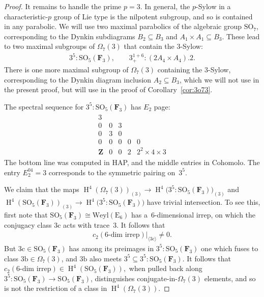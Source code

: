 \documentclass[pdftex]{sigma}
\numberwithin{equation}{section}
\newcommand\bF{\mathbf F}
\newcommand\bZ{\mathbf Z}
\newcommand\rb{\mathrm b}
\newcommand\rc{\mathrm c}
\newcommand\rE{\mathrm E}
\DeclareMathOperator\homology{H}
\renewcommand\H{\homology}
\newcommand\<\langle
\renewcommand\>\rangle
\newcommand\SO{\mathrm{SO}}
\begin{document}
\begin{proof}
 It remains to handle the prime $p=3$. In general,
 the $p$-Sylow in a characteristic-$p$ group of Lie type is the nilpotent subgroup, and so is contained in any parabolic. We will use two maximal parabolics of
 the algebraic group
 $\mathrm{SO}_7$,
 corresponding to the Dynkin subdiagrams $B_2 \subseteq B_3$ and $A_1 \times A_1 \subseteq B_3$. These lead to two maximal subgroups of $\Omega_7(3)$ that contain the $3$-Sylow:
 \begin{gather*} 3^5:\mathrm{SO}_5(\bF_3), \qquad 3^{1+6}_+\colon (2A_4 \times A_4).2. \end{gather*}
 There is one more maximal subgroup of $\Omega_7(3)$ containing the $3$-Sylow, corresponding to the Dynkin diagram inclusion $A_2 \subseteq B_3$, which we will not use in the present proof, but will use in the proof of Corollary~\ref{cor:3o73}.

 The spectral sequence for $3^5:\mathrm{SO}_5(\bF_3)$ has $E_2$ page:
 \begin{gather*} \begin{array}{ccccc}
 3 \\
 0 & 0 & 3 \\
 0 & 3 & 0 \\
 0 & 0 & 0 & 0 & 0 \\
 \bZ & 0 & 0 & 2 & 2^2 \times 4 \times 3
 \end{array} \end{gather*}
 The bottom line was computed in HAP, and the middle entries in Cohomolo. The entry $E_2^{04} = 3$ corresponds to the symmetric pairing on~$3^5$.

We claim that the maps $\H^4(\Omega_7(3))_{(3)} \to \H^4\big(3^5:\mathrm{SO}_5(\bF_3)\big)_{(3)}$ and $\H^4(\mathrm{SO}_5(\bF_3))_{(3)} \to \H^4\big(3^5:\mathrm{SO}_5(\bF_3)\big)$ have trivial intersection. To see this, first note that $\mathrm{SO}_5(\bF_3) \cong \mathrm{Weyl}(\rE_6)$ has a~$6$-dimensional irrep, on which the conjugacy class $3\rc$ acts with trace~$3$. It follows that \begin{gather*}c_2(\text{6-dim irrep})|_{\langle 3\rc\rangle} \neq 0.\end{gather*}
But $3\rc \in \mathrm{SO}_5(\bF_3)$ has among its preimages in $3^5:\SO_5(\bF_3)$ one which fuses to class $3\rb \in \Omega_7(3)$, and $3\rb$ also meets $3^5 \subseteq 3^5:\mathrm{SO}_5(\bF_3)$. It follows that $c_2(\text{6-dim irrep}) \in \H^4(\mathrm{SO}_5(\bF_3)),$ when pulled back along $3^5:\mathrm{SO}_5(\bF_3) \to \mathrm{SO}_5(\bF_3)$, distinguishes conjugate-in-$\Omega_7(3)$ elements, and so is not the restriction of a class in $\H^4(\Omega_7(3))$.


\end{proof}
\end{document}
